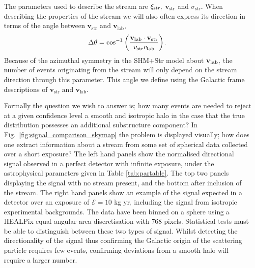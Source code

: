 The parameters used to describe the stream are $\xi_{\rm str}$, $\textbf{v}_\textrm{str}$ and $\sigma_\textrm{str}$. When describing the properties of the stream we will also often express its direction in terms of the angle between $\textbf{v}_\textrm{str}$ and $\textbf{v}_\textrm{lab}$,
\begin{equation}\label{eq:deltatheta}
      \Delta \theta = \cos^{-1}\left(\frac{\textbf{v}_\textrm{lab} \cdot \textbf{v}_\textrm{str}}{v_{\rm str} v_{\rm lab}}\right).
\end{equation}
Because of the azimuthal symmetry in the SHM+Str model about $\textbf{v}_{\rm lab}$, the number of events originating from the stream will only depend on the stream direction through this parameter. This angle we define using the Galactic frame descriptions of $\textbf{v}_\textrm{str}$ and $\textbf{v}_\textrm{lab}$.

Formally the question we wish to answer is; how many events are needed to reject at a given confidence level a smooth and isotropic halo in the case that the true distribution possesses an additional substructure component? In Fig.~\ref{fig:signal_comparison_skymap} the problem is displayed visually; how does one extract information about a stream from some set of spherical data collected over a short exposure? The left hand panels show the normalised directional signal observed in a perfect detector with infinite exposure, under the astrophysical parameters given in Table \ref{tab:partable}. The top two panels displaying the signal with no stream present, and the bottom after inclusion of the stream. The right hand panels show an example of the signal expected in a detector over an exposure of $\mathcal{E}=10$ kg yr, including the signal from isotropic experimental backgrounds. The data have been binned on a sphere using a HEALPix \cite{Gorski:2004by} equal angular area discretisation with 768 pixels. Statistical tests must be able to distinguish between these two types of signal. Whilst detecting the directionality of the signal thus confirming the Galactic origin of the scattering particle requires few events, confirming deviations from a smooth halo will require a larger number.

